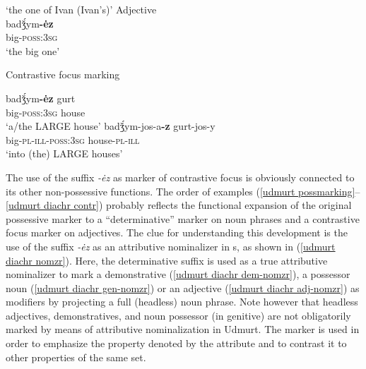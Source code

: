\begin{exe}
\begin{xlist}
\begin{xlist}
\glt	 ‘the one of Ivan (Ivan's)’
\ex 	\rm{Adjective}\\ \label{udmurt diachr adj-nomzr}
\gll	badǯ́ym\textbf{-ėz}\\
	big-\textsc{poss:3sg}\\
\glt	 ‘the big one’
\end{xlist}
\ex \rm{Contrastive focus marking} \label{udmurt diachr contr}
\begin{xlist}
\ex	
\gll	badǯ́ym\textbf{-ėz} gurt\\
	big-\textsc{poss:3sg} house\\
\glt	‘a/the LARGE house’
\ex	
\gll	badǯ́ym-jos-a\textbf{-z} gurt-jos-y\\
	big-\textsc{pl}-\textsc{ill}-\textsc{poss:3sg} house-\textsc{pl}-\textsc{ill}\\
\glt	‘into (the) LARGE houses’
\end{xlist}
\end{xlist}
\end{exe}
The use of the suffix \textit{-ėz} as marker of contrastive focus is obviously connected to its other non-possessive functions. The order of examples (\ref{udmurt possmarking}–\ref{udmurt diachr contr}) probably reflects the functional expansion of the original possessive marker to a “determinative” marker on noun phrases and a contrastive focus marker on adjectives. The clue for understanding this development is the use of the suffix \textit{-ėz} as an attributive nominalizer in s, as shown in (\ref{udmurt diachr nomzr}). Here, the determinative suffix is used as a true attributive nominalizer to mark a demonstrative (\ref{udmurt diachr dem-nomzr}), a possessor noun (\ref{udmurt diachr gen-nomzr}) or an adjective (\ref{udmurt diachr adj-nomzr}) as modifiers by projecting a full (headless) noun phrase. Note however that headless adjectives, demonstratives, and noun possessor (in genitive) are not obligatorily marked by means of attributive nominalization in Udmurt. The marker is used in order to emphasize the property denoted by the attribute and to contrast it to other properties of the same set.

